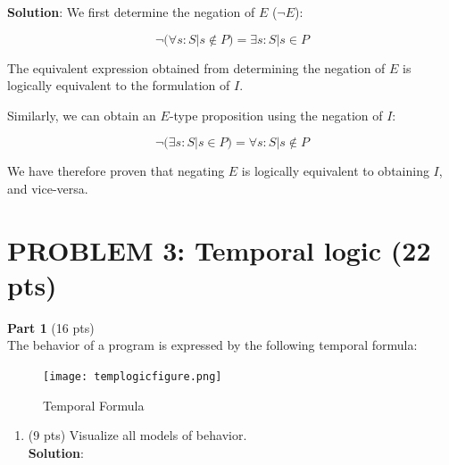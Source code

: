 \documentclass[12pt]{article}
\begin{document}
\begin{spacing}{1.5}
\begin{enumerate}
		      \textbf{Solution}: We first determine the negation of $E$ ($\neg E$):
		      		      		      		      		      
		      $$\neg (\forall s : S | s \notin P)=\exists s : S | s \in P$$
		      		      		      		      		      
		      The equivalent expression obtained from determining the negation of $E$ is logically equivalent to the formulation of $I$.
		      		      		      		      		      
		      Similarly, we can obtain an $E$-type proposition using the negation of $I$:
		      		      		      		      		      
		      $$\neg (\exists s : S | s \in P) = \forall s : S | s \notin P$$
		      		      		      		      		      
		      We have therefore proven that negating $E$ is logically equivalent to obtaining $I$, and vice-versa.
		      		      		      		      		      
	\end{enumerate}
						    
					    
	\newpage
					    
	\section*{PROBLEM 3: Temporal logic (22 pts)}
					
	\textbf{Part 1} (16 pts)\\
					    
	The behavior of a program is expressed by the following temporal formula:
					
	\begin{figure}[htp]
		\centering
		\texttt{[image: templogicfigure.png]}
		\caption{Temporal Formula}
		\label{fig:figure}
	\end{figure}
					
					    
					
	\begin{enumerate}
		\item (9 pts) Visualize all models of behavior.\\
		      \textbf{Solution}:\\
		      \begin{center}
\end{center}
\end{enumerate}
\end{spacing}
\end{document}
